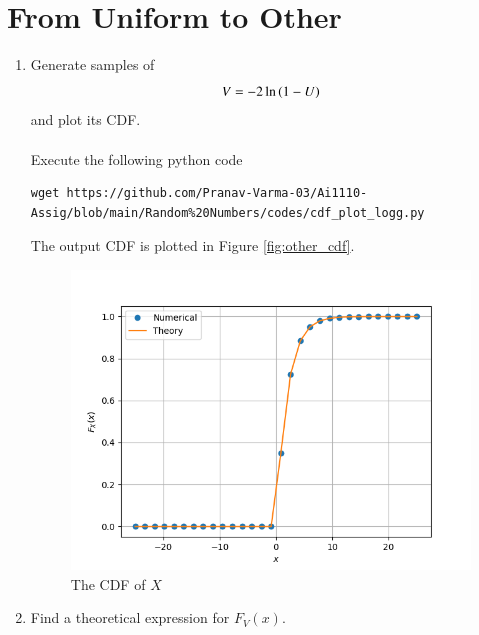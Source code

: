 \documentclass[journal,12pt,twocolumn]{IEEEtran}
\renewcommand\thesection{\arabic{section}}
\begin{document}
\section{From Uniform to Other}
\begin{enumerate}[label=\textbf{\thesection.\arabic*},ref=\thesection.\theenumi]
%
\item
Generate samples of 
%
\begin{equation}
V = -2\ln\left(1-U\right)
\end{equation}
%
and plot its CDF. 
\\
\\
\solution
Execute the following python code
\begin{lstlisting}
wget https://github.com/Pranav-Varma-03/Ai1110-Assig/blob/main/Random%20Numbers/codes/cdf_plot_logg.py
\end{lstlisting}
%
The output CDF is plotted in Figure \eqref{fig:other_cdf}.
\begin{figure}[!ht]
\centering
\includegraphics[width=\columnwidth]{figs/cdf_plot_other.png}
\caption{The CDF of $X$}
\label{fig:other_cdf}
\end{figure}
%
%
\item Find a theoretical expression for $F_V(x)$.


\end{enumerate}
\end{document}
